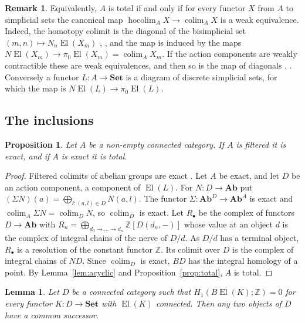 \documentclass[11pt,a4paper]{article}
\newtheorem{proposition}[theorem]{Proposition}
\newtheorem{lemma}[theorem]{Lemma}
\theoremstyle{definition}
\newtheorem{remark}[theorem]{Remark}
\newcommand{\El}{\operatorname{El}}
\newcommand{\colim}{\operatorname{colim}}
\newcommand{\Set}{\mathbf{Set}}
\newcommand{\Ab}{\mathbf{Ab}}
\newcommand{\Z}{\mathbb{Z}}
\begin{document}
\begin{remark}\label{rem:hocolim}
Equivalently, $A$ is total if and only if for every functor $X$ from $A$ to
simplicial sets the canonical map $\operatorname{hocolim}_AX\to\colim_AX$ is a
weak equivalence. Indeed, the homotopy colimit is the diagonal of the
bisimplicial set $(m,n)\mapsto N_n\El(X_m)$ \cite[Chapter~XII]{BK}, \cite[Sections~21 and~22]{JardineL8}, and the map
is induced by the maps $N\El(X_m)\to\pi_0\El(X_m)=\colim_AX_m$. If the action
components are weakly contractible these are weak equivalences, and then so is
the map of diagonals \cite[Lemma~21.1]{JardineL8}, \cite[Chapter~IV]{GJ}. Conversely a functor
$L\colon A\to\Set$ is a diagram of discrete simplicial sets, for which the map
is $N\El(L)\to\pi_0\El(L)$.
\end{remark}

\subsection{The inclusions}

\begin{proposition}\label{prop:incl}
Let $A$ be a non-empty connected category. If $A$ is filtered it is exact,
and if $A$ is exact it is total.
\end{proposition}

\begin{proof}
Filtered colimits of abelian groups are exact
\cite[Section~2.6]{Weibel}. Let $A$ be exact, and let $D$ be an action
component, a component of $\El(L)$. For $N\colon D\to\Ab$ put
$(\Sigma N)(a)=\bigoplus_{l:(a,l)\in D}N(a,l)$. The functor
$\Sigma\colon\Ab^D\to\Ab^A$ is exact and $\colim_A\Sigma N=\colim_DN$, so
$\colim_D$ is exact. Let $R_\bullet$ be the complex of functors $D\to\Ab$
with $R_n=\bigoplus_{d_0\to\dots\to d_n}\Z[D(d_n,-)]$ whose value at an object
$d$ is the complex of integral chains of the nerve of $D/d$. As $D/d$ has a
terminal object, $R_\bullet$ is a resolution of the constant functor $\Z$.
Its colimit over $D$ is the complex of integral chains of $ND$. Since
$\colim_D$ is exact, $BD$ has the integral homology of a point. By
Lemma~\ref{lem:acyclic} and Proposition~\ref{prop:total}, $A$ is total.
\end{proof}

\begin{lemma}\label{lem:succ}
Let $D$ be a connected category such that $H_1(B\El(K);\Z)=0$ for every
functor $K\colon D\to\Set$ with $\El(K)$ connected. Then any two objects of
$D$ have a common successor.
\end{lemma}
\end{document}

